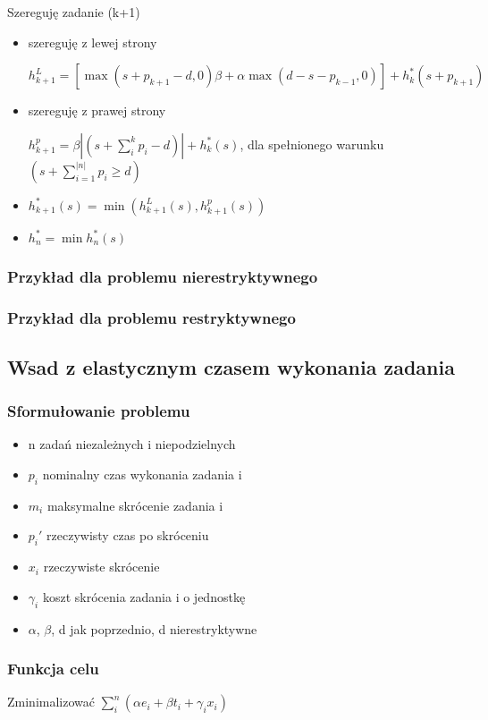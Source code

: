 \documentclass[12pt,a4paper]{article}
\begin{document}
Szereguję zadanie (k+1)
\begin{itemize}
	\item szereguję z lewej strony
	
	$h_{k+1}^{L}=[\max(s+p_{k+1}-d,0)\beta + \alpha\max(d-s-p_{k-1},0)]+h_{k}^{*}(s+p_{k+1})$
	\item szereguję z prawej strony
	
	$h_{k+1}^{p}=\beta\left | (s+\sum\limits_{i}^{k}p_{i}-d) \right | +h_{k}^{*}(s)$, dla spełnionego warunku $(s+\sum\limits_{i=1}^{|n|}p_{i}\geq d)$
	\item $h_{k+1}^{*}(s)=\min(h_{k+1}^{L}(s), h_{k+1}^{p}(s))$
	\item $h_{n}^{*}=\min h_{n}^{*}(s)$
\end{itemize}
\subsubsection{Przykład dla problemu nierestryktywnego}
\subsubsection{Przykład dla problemu restryktywnego}

\subsection{Wsad z elastycznym czasem wykonania zadania}
\subsubsection{Sformułowanie problemu}
\begin{itemize}
\item n zadań niezależnych i niepodzielnych
\item $p_{i}$ nominalny czas wykonania zadania i
\item $m_{i}$ maksymalne skrócenie zadania i
\item $p_{i}'$ rzeczywisty czas po skróceniu
\item $x_{i}$ rzeczywiste skrócenie
\item $\gamma_{i}$ koszt skrócenia zadania i o jednostkę
\item $\alpha$, $\beta$, d jak poprzednio, d nierestryktywne
\end{itemize}
\subsubsection{Funkcja celu}
Zminimalizować $\sum\limits_{i}^{n}(\alpha e_{i}+\beta t_{i} + \gamma_{i}x_{i})$
\end{document}
